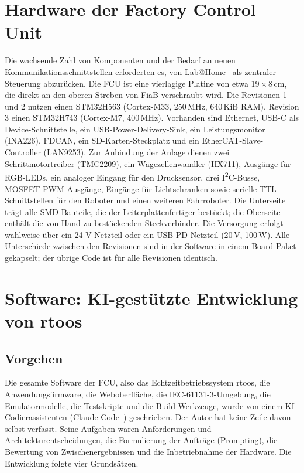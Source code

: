 \documentclass[]{article}
\begin{document}
\section{Hardware der Factory Control Unit}\label{sec:hw}

Die wachsende Zahl von Komponenten und der Bedarf an neuen Kommunikationsschnittstellen erforderten es, von Lab@Home~\cite{liebler2023} als zentraler Steuerung abzurücken. Die FCU ist eine vierlagige Platine von etwa 19\,$\times$\,8\,cm, die direkt an den oberen Streben von FiaB verschraubt wird. Die Revisionen 1 und 2 nutzen einen STM32H563 (Cortex-M33, 250\,MHz, 640\,KiB RAM), Revision 3 einen STM32H743 (Cortex-M7, 400\,MHz). Vorhanden sind Ethernet, USB-C als Device-Schnittstelle, ein USB-Power-Delivery-Sink, ein Leistungsmonitor (INA226), FDCAN, ein SD-Karten-Steckplatz und ein EtherCAT-Slave-Controller (LAN9253). Zur Anbindung der Anlage dienen zwei Schrittmotortreiber (TMC2209), ein Wägezellenwandler (HX711), Ausgänge für RGB-LEDs, ein analoger Eingang für den Drucksensor, drei I\textsuperscript{2}C-Busse, MOSFET-PWM-Ausgänge, Eingänge für Lichtschranken sowie serielle TTL-Schnittstellen für den Roboter und einen weiteren Fahrroboter. Die Unterseite trägt alle SMD-Bauteile, die der Leiterplattenfertiger bestückt; die Oberseite enthält die von Hand zu bestückenden Steckverbinder. Die Versorgung erfolgt wahlweise über ein 24-V-Netzteil oder ein USB-PD-Netzteil (20\,V, 100\,W). Alle Unterschiede zwischen den Revisionen sind in der Software in einem Board-Paket gekapselt; der übrige Code ist für alle Revisionen identisch.

\section{Software: KI-gestützte Entwicklung von rtoos}\label{sec:sw}

\subsection{Vorgehen}

Die gesamte Software der FCU, also das Echtzeitbetriebssystem rtoos, die Anwendungsfirmware, die Weboberfläche, die IEC-61131-3-Umgebung, die Emulatormodelle, die Testskripte und die Build-Werkzeuge, wurde von einem KI-Codierassistenten (Claude Code~\cite{claudecode}) geschrieben. Der Autor hat keine Zeile davon selbst verfasst. Seine Aufgaben waren Anforderungen und Architekturentscheidungen, die Formulierung der Aufträge (Prompting), die Bewertung von Zwischenergebnissen und die Inbetriebnahme der Hardware. Die Entwicklung folgte vier Grundsätzen.
\end{document}
